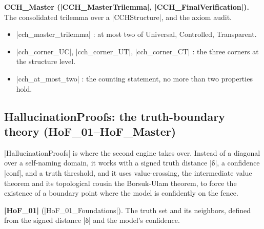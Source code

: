 \documentclass{memoir}
\begin{document}
\textbf{CCH\_Master (\LeanVerb|CCH_MasterTrilemma|, \LeanVerb|CCH_FinalVerification|).} The consolidated
trilemma over a \LeanVerb|CCHStructure|, and the axiom audit.

\begin{itemize}
\item \LeanVerb|cch_master_trilemma| : at most two of Universal, Controlled, Transparent.
\item \LeanVerb|cch_corner_UC|, \LeanVerb|cch_corner_UT|, \LeanVerb|cch_corner_CT| : the three corners at the
   structure level.
\item \LeanVerb|cch_at_most_two| : the counting statement, no more than two properties hold.

\end{itemize}




\subsection{HallucinationProofs: the truth-boundary theory (HoF\_01–HoF\_Master)}\label{Two--Schemas--of--Impossibility-005F-005F-005F--Machine--Checked--Limits--of--Trustworthy--Machine--Learning-005F-005F-005F--and--Why--They--Tighten--with--Capability----Appendices----The--Formal--Corpus----HallucinationProofs-005F-005F-005F--the--truth--boundary--theory---005FLPAR-005FHoF-005F01-005F-005F-005FHoF-005FMaster-005FRPAR-005F}

\LeanVerb|HallucinationProofs| is where the second engine takes over. Instead of a diagonal
over a self-naming domain, it works with a signed truth distance \LeanVerb|δ|, a confidence
\LeanVerb|conf|, and a truth threshold, and it uses value-crossing, the intermediate value
theorem and its topological cousin the Borsuk-Ulam theorem, to force the existence
of a boundary point where the model is confidently on the fence.

\textbf{\LeanVerb|HoF_01|} (\LeanVerb|HoF_01_Foundations|). The truth set and its neighbors, defined from the
signed distance \LeanVerb|δ| and the model's confidence.
\end{document}
